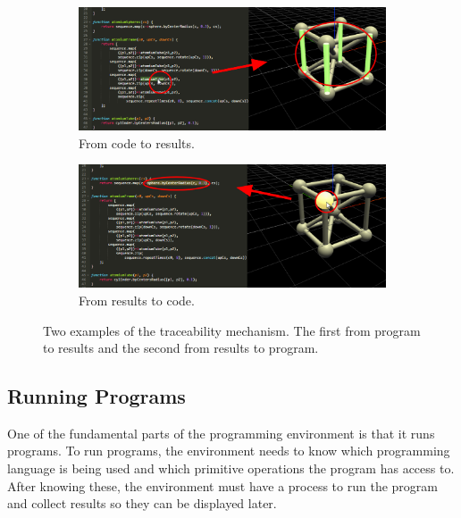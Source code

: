 \begin{figure}
  \centering
  \begin{subfigure}[b]{1.0\textwidth}
    \includegraphics[width=1.0\textwidth]{./images/traceability_example/code_to_results_crop}
    \caption{From code to results.}
    \label{sub:code:to:results}
  \end{subfigure}

  \begin{subfigure}[b]{1.0\textwidth}
    \includegraphics[width=1.0\textwidth]{./images/traceability_example/results_to_code_crop}
    \caption{From results to code.}
    \label{sub:results:to:code}
  \end{subfigure}
  \caption{Two examples of the traceability mechanism. The first from program to results and the second from results to program.}
  \label{fig:trace:example}
\end{figure}


\subsection{Running Programs}
\label{sec:run:progs}
One of the fundamental parts of the programming environment is that it runs programs.
To run programs, the environment needs to know which programming language is being used and which primitive operations the program has access to.
After knowing these, the environment must have a process to run the program and collect results so they can be displayed later.


